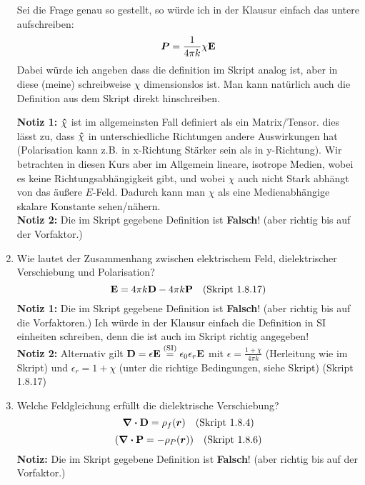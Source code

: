 \begin{enumerate}
        Sei die Frage genau so gestellt, so würde ich in der Klausur einfach
        das untere aufschreiben:
        \begin{equation*}
          \vb*P = \frac{1}{4\pi k}\chi \vb E 
        \end{equation*}
        Dabei würde ich angeben dass die definition im Skript analog ist,
        aber in diese (meine) schreibweise $\chi$ dimensionslos ist. 
        Man kann natürlich auch die Definition aus dem Skript direkt
        hinschreiben.

        \textbf{Notiz 1:} $\vu \chi$ ist im allgemeinsten Fall 
        definiert als ein Matrix/Tensor.
        dies lässt zu, dass $\vu \chi$ in unterschiedliche Richtungen
        andere Auswirkungen hat (Polarisation kann z.B. in x-Richtung
        Stärker sein als in y-Richtung). Wir betrachten in diesen Kurs 
        aber im Allgemein
        lineare, isotrope Medien, wobei es keine Richtungsabhängigkeit
        gibt, und wobei $\chi$ auch nicht Stark abhängt von das äußere
        $E$-Feld. Dadurch kann
        man $\chi$ als eine Medienabhängige skalare Konstante 
        sehen/nähern.\\
        \textbf{Notiz 2:} Die im Skript gegebene Definition ist 
        \textbf{Falsch}! (aber richtig bis auf der Vorfaktor.)\\

  \item Wie lautet der Zusammenhang zwischen elektrischem Feld, 
        dielektrischer Verschiebung und Polarisation?
        $$\vb E= 4\pi k\vb D - 4\pi k\vb P \quad\text{(Skript 1.8.17)}$$
        \textbf{Notiz 1:} Die im Skript gegebene Definition ist 
        \textbf{Falsch}! (aber richtig bis auf die Vorfaktoren.)
        Ich würde in der Klausur einfach die Definition in SI einheiten
        schreiben, denn die ist auch im Skript richtig angegeben!\\
        \textbf{Notiz 2:} Alternativ gilt $\vb D=\epsilon \vb E
        \stackrel{\text{(SI)}}=\epsilon_0\epsilon_r \vb E$ mit
        $\epsilon=\frac{1+\chi}{4\pi k}$ (Herleitung wie im Skript) und
        $\epsilon_r=1+\chi$
        (unter die richtige Bedingungen, siehe Skript) (Skript 1.8.17)\\

  \item Welche Feldgleichung erfüllt die dielektrische Verschiebung?
        $$\div \vb D=\rho_f(\vb* r)\quad\text{(Skript 1.8.4)}$$
        $$\qty(\div \vb P=-\rho_P(\vb* r))\quad\text{(Skript 1.8.6)}$$
        \textbf{Notiz:} Die im Skript gegebene Definition ist 
        \textbf{Falsch}! (aber richtig bis auf der Vorfaktor.)


\end{enumerate}
